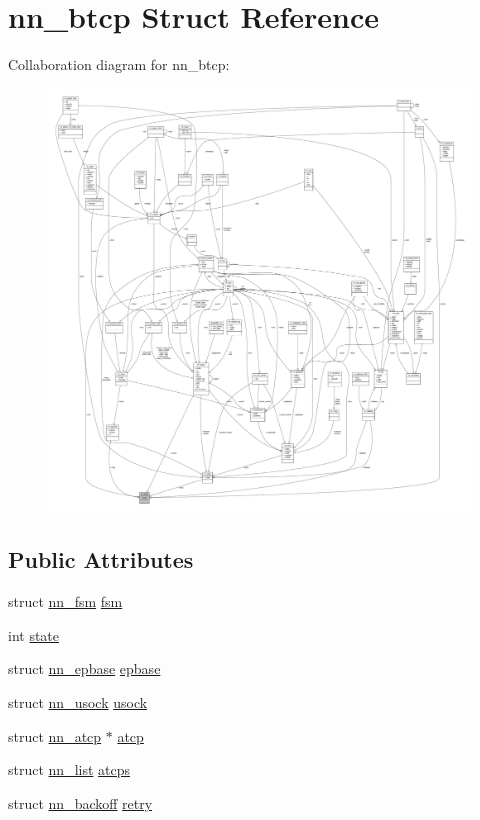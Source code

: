\hypertarget{structnn__btcp}{}\section{nn\+\_\+btcp Struct Reference}
\label{structnn__btcp}


Collaboration diagram for nn\+\_\+btcp\+:\nopagebreak
\begin{figure}[H]
\begin{center}
\leavevmode
\includegraphics[width=350pt]{structnn__btcp__coll__graph}
\end{center}
\end{figure}
\subsection*{Public Attributes}
\begin{DoxyCompactItemize}
\item 
struct \hyperlink{structnn__fsm}{nn\+\_\+fsm} \hyperlink{structnn__btcp_a6886990fa4dd60e2535396aee2a97808}{fsm}
\item 
int \hyperlink{structnn__btcp_ac4e1a393ee479ac93b3d700f92099605}{state}
\item 
struct \hyperlink{structnn__epbase}{nn\+\_\+epbase} \hyperlink{structnn__btcp_acf1bdc439c5e15227dcb9da067d33c82}{epbase}
\item 
struct \hyperlink{structnn__usock}{nn\+\_\+usock} \hyperlink{structnn__btcp_a1f5c9c60495f0d5cd20611d3bcc9aaa0}{usock}
\item 
struct \hyperlink{structnn__atcp}{nn\+\_\+atcp} $\ast$ \hyperlink{structnn__btcp_a938d221e28e4dd8b259f446287677a7b}{atcp}
\item 
struct \hyperlink{structnn__list}{nn\+\_\+list} \hyperlink{structnn__btcp_a12b26d20ebff3da6c00c5dce249e2003}{atcps}
\item 
struct \hyperlink{structnn__backoff}{nn\+\_\+backoff} \hyperlink{structnn__btcp_a113d8b4835aeec6c8df2f7cf9ffdea5f}{retry}
\end{DoxyCompactItemize}


